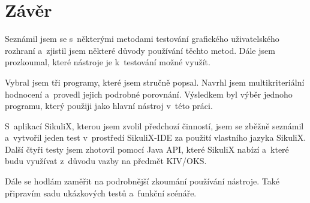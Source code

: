 \chapter{Závěr}
Seznámil jsem se s~některými metodami testování grafického uživatelského rozhraní a~zjistil jsem některé důvody používání těchto metod. Dále jsem prozkoumal, které nástroje je k~testování možné využít.

Vybral jsem tři programy, které jsem stručně popsal. Navrhl jsem multikriteriální hodnocení a~provedl jejich podrobné porovnání. Výsledkem byl výběr jednoho programu, který použiji jako hlavní nástroj v~této práci.

S~aplikací SikuliX, kterou jsem zvolil předchozí činností, jsem se zběžně seznámil a~vytvořil jeden test v~prostředí SikuliX-IDE za použití vlastního jazyka SikuliX. Další čtyři testy jsem zhotovil pomocí Java API, které SikuliX nabízí a~které budu využívat z~důvodu vazby na předmět KIV/OKS.

Dále se hodlám zaměřit na podrobnější zkoumání používání nástroje. Také připravím sadu ukázkových testů a~funkční scénáře.